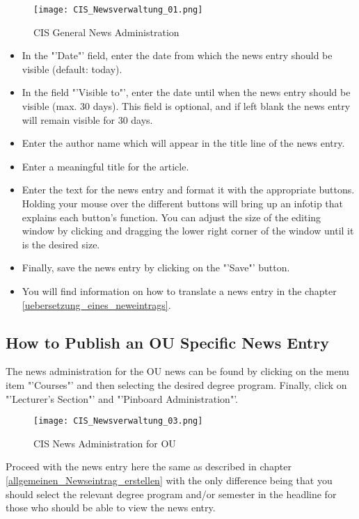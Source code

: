 \begin{figure}
	\centering
	\texttt{[image: CIS\_Newsverwaltung\_01.png]}
	\caption{CIS General News Administration}
	\label{CIS_newsverwaltung01}
\end{figure}

		\begin{itemize}
			\item In the "'Date"' field, enter the date from which the news entry should be visible (default: today).
			\item In the field "'Visible to"', enter the date until when the news entry should be visible (max. 30 days). This field is optional, and if left blank the news entry will remain visible for 30 days.
			\item Enter the author name which will appear in the title line of the news entry.
			\item Enter a meaningful title for the article.
			\item Enter the text for the news entry and format it with the appropriate buttons. Holding your mouse over the different buttons will bring up an infotip that explains each button's function.
			You can adjust the size of the editing window by clicking and dragging the lower right corner of the window until it is the desired size.
			\item Finally, save the news entry by clicking on the "'Save"' button.
			\item You will find information on how to translate a news entry in the chapter \ref{uebersetzung_eines_neweintrags}.
		\end{itemize}
		
\subsection{How to Publish an OU Specific News Entry}
The news administration for the OU news can be found by clicking on the menu item "'Courses"' and then selecting the desired degree program.
Finally, click on "'Lecturer's Section"' and "'Pinboard Administration"'.

\begin{figure}
	\centering
	\texttt{[image: CIS\_Newsverwaltung\_03.png]}
	\caption{CIS News Administration for OU}
	\label{CIS_newsverwaltung03}
\end{figure}

Proceed with the news entry here the same as described in chapter \ref{allgemeinen_Newseintrag_erstellen} with the only difference being that you should select the relevant degree program and/or semester in the headline for those who should be able to view the news entry.

